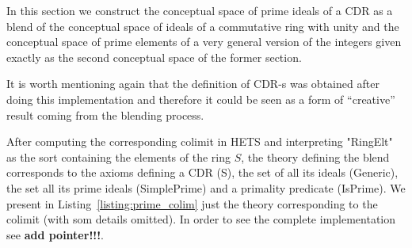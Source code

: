 


In this section we construct the conceptual space of prime ideals of
a CDR as a blend of the conceptual space of ideals
of a commutative ring with unity and the conceptual space of prime
elements of a very general version of the integers given exactly as
the second conceptual space of the former section.

It is worth mentioning again that the definition of CDR-s was obtained after
doing this implementation and therefore it could be seen as a form of
``creative'' result coming from the blending process.


After computing the corresponding colimit in HETS and interpreting
"RingElt" as the sort containing the elements of the ring $S$, the
theory defining the blend corresponds to the axioms defining a CDR
(S), the set of all its ideals (Generic), the set all its prime ideals
(SimplePrime) and a primality predicate (IsPrime).  We present 
in Listing~\ref{listing:prime_colim}
just the theory corresponding to the colimit (with som details
omitted). In order to see the
complete implementation see \textbf{add pointer!!!}.

